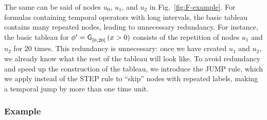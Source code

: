 \documentclass[acmsmall,screen]{acmart}
\begin{document}
The same can be said of nodes $u_0$, $u_1$, and $u_2$ in Fig.~\ref{fig:F-example}.
For formulas containing temporal operators with long intervals,
the basic tableau contains many repeated nodes, leading to unnecessary redundancy.
For instance, the basic tableau for $\phi' = \mathop{\mathsf{\mathsf{G}}^{{}}_{[0,20]}}{(x > 0)}$
consists of the repetition of nodes $u_1$ and $u_2$ for 20 times.
This redundancy is unnecessary: once we have created $u_1$ and $u_2$,
we already know what the rest of the tableau will look like.
To avoid redundancy and speed up the construction of the tableau,
we introduce the \textsf{JUMP} rule, which we apply instead of the \textsf{STEP} rule
to ``skip'' nodes with repeated labels, making a temporal jump by more than one time unit.

\subsubsection{Example}
\end{document}
